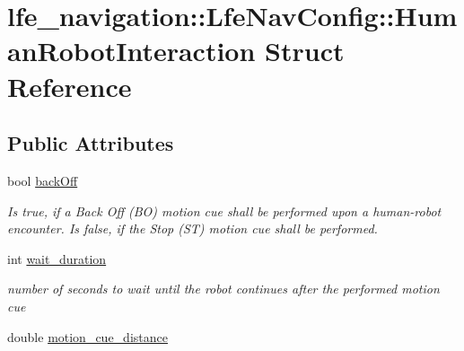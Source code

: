 \hypertarget{structlfe__navigation_1_1LfeNavConfig_1_1HumanRobotInteraction}{}\section{lfe\+\_\+navigation\+:\+:Lfe\+Nav\+Config\+:\+:Human\+Robot\+Interaction Struct Reference}
\label{structlfe__navigation_1_1LfeNavConfig_1_1HumanRobotInteraction}
\subsection*{Public Attributes}
\begin{DoxyCompactItemize}
\item 
bool \hyperlink{structlfe__navigation_1_1LfeNavConfig_1_1HumanRobotInteraction_aa4705f39b0859f027c8f768221cebe7e}{back\+Off}\hypertarget{structlfe__navigation_1_1LfeNavConfig_1_1HumanRobotInteraction_aa4705f39b0859f027c8f768221cebe7e}{}\label{structlfe__navigation_1_1LfeNavConfig_1_1HumanRobotInteraction_aa4705f39b0859f027c8f768221cebe7e}

\begin{DoxyCompactList}\small\item\em Is true, if a Back Off (BO) motion cue shall be performed upon a human-\/robot encounter. Is false, if the Stop (ST) motion cue shall be performed. \end{DoxyCompactList}\item 
int \hyperlink{structlfe__navigation_1_1LfeNavConfig_1_1HumanRobotInteraction_a173fd2056883efadc8d872d291273f9d}{wait\+\_\+duration}\hypertarget{structlfe__navigation_1_1LfeNavConfig_1_1HumanRobotInteraction_a173fd2056883efadc8d872d291273f9d}{}\label{structlfe__navigation_1_1LfeNavConfig_1_1HumanRobotInteraction_a173fd2056883efadc8d872d291273f9d}

\begin{DoxyCompactList}\small\item\em number of seconds to wait until the robot continues after the performed motion cue \end{DoxyCompactList}\item 
double \hyperlink{structlfe__navigation_1_1LfeNavConfig_1_1HumanRobotInteraction_ace6217487c333605b2368d7b8332355b}{motion\+\_\+cue\+\_\+distance}\hypertarget{structlfe__navigation_1_1LfeNavConfig_1_1HumanRobotInteraction_ace6217487c333605b2368d7b8332355b}{}\label{structlfe__navigation_1_1LfeNavConfig_1_1HumanRobotInteraction_ace6217487c333605b2368d7b8332355b}


\end{DoxyCompactItemize}
